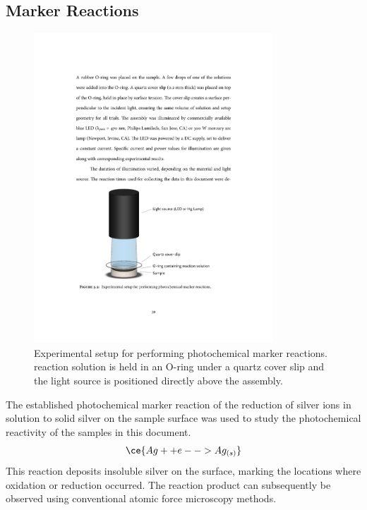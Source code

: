 \subsection{Marker Reactions}
\label{subsec:exp.markerreactions}

\begin{figure}
\begin{center}
\includegraphics[width=0.8\textwidth]{rxnsetup.pdf}
\caption[Experimental setup for marker reactions]{%
	Experimental setup for performing photochemical marker 
	reactions.  reaction solution is held in an 
	O-ring under a quartz cover slip and the light source 
	is positioned directly above the assembly.}
\label{fig:rxnsetup}
\end{center}
\end{figure}
The established photochemical marker reaction of the reduction of silver ions in solution
to solid silver on the sample surface was used to study the photochemical reactivity of
the samples in this document.
\begin{equation}
\ce{Ag+ + e- -> Ag_{(s)}}
\end{equation}
This reaction deposits insoluble silver on the surface, marking the locations where
oxidation or reduction
occurred.\cite{Giocondi:2001gz,Burbure:2010go,Giocondi:2001bi,Burbure:2010ti,Bhardwaj:2010eh,%
Giocondi:2008ja,Lowekamp:1998ks,MorrisHotsenpiller:1998jq} The reaction product can
subsequently be observed using conventional atomic force microscopy methods.

